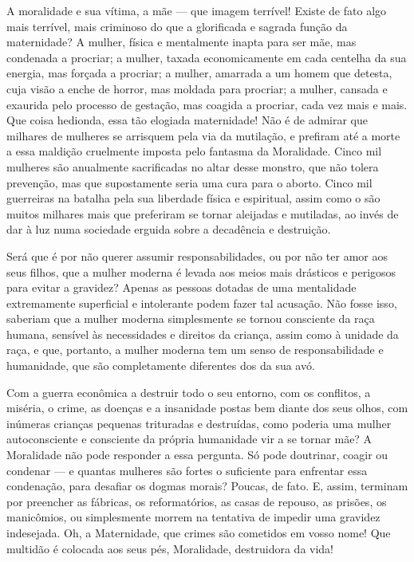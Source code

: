 A moralidade e sua vítima, a mãe --- que imagem terrível! Existe de fato
algo mais terrível, mais criminoso do que a glorificada e sagrada função
da maternidade? A mulher, física e mentalmente inapta para ser mãe, mas
condenada a procriar; a mulher, taxada economicamente em cada centelha
da sua energia, mas forçada a procriar; a mulher, amarrada a um homem
que detesta, cuja visão a enche de horror, mas moldada para procriar; a
mulher, cansada e exaurida pelo processo de gestação, mas coagida a
procriar, cada vez mais e mais. Que coisa hedionda, essa tão elogiada
maternidade! Não é de admirar que milhares de mulheres se arrisquem pela
via da mutilação, e prefiram até a morte a essa maldição cruelmente
imposta pelo fantasma da Moralidade. Cinco mil mulheres são anualmente
sacrificadas no altar desse monstro, que não tolera prevenção, mas que
supostamente seria uma cura para o aborto. Cinco mil guerreiras na
batalha pela sua liberdade física e espiritual, assim como o são muitos
milhares mais que preferiram se tornar aleijadas e mutiladas, ao invés
de dar à luz numa sociedade erguida sobre a decadência e destruição.

Será que é por não querer assumir responsabilidades, ou por não ter amor
aos seus filhos, que a mulher moderna é levada aos meios mais drásticos
e perigosos para evitar a gravidez? Apenas as pessoas dotadas de uma
mentalidade extremamente superficial e intolerante podem fazer tal
acusação. Não fosse isso, saberiam que a mulher moderna
simplesmente se tornou consciente da raça humana, sensível às
necessidades e direitos da criança, assim como à unidade da raça, e que,
portanto, a mulher moderna tem um senso de responsabilidade e
humanidade, que são completamente diferentes dos da sua avó.

Com a guerra econômica a destruir todo o seu entorno, com os conflitos,
a miséria, o crime, as doenças e a insanidade postas bem diante dos seus
olhos, com inúmeras crianças pequenas trituradas e destruídas, como
poderia uma mulher autoconsciente e consciente da própria humanidade vir
a se tornar mãe? A Moralidade não pode responder a essa pergunta. Só
pode doutrinar, coagir ou condenar --- e quantas mulheres são fortes o
suficiente para enfrentar essa condenação, para desafiar os dogmas
morais? Poucas, de fato. E, assim, terminam por preencher as fábricas,
os reformatórios, as casas de repouso, as prisões, os manicômios, ou
simplesmente morrem na tentativa de impedir uma gravidez indesejada. Oh,
a Maternidade, que crimes são cometidos em vosso nome! Que multidão é
colocada aos seus pés, Moralidade, destruidora da vida!

